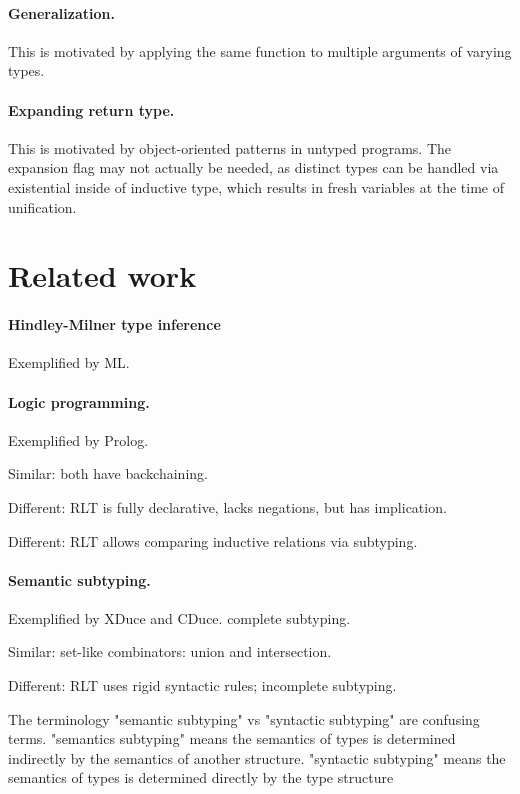 \documentclass[acmsmall]{acmart}
\begin{document}
\paragraph{Generalization.} This is motivated by applying the same function to multiple arguments of varying types.
\paragraph{Expanding return type.}  
This is motivated by object-oriented patterns in untyped programs.
The expansion flag may not actually be needed, as distinct types can be handled via existential inside of inductive type,
which results in fresh variables at the time of unification.

\section{Related work}

\paragraph{Hindley-Milner type inference}
Exemplified by ML.

\paragraph{Logic programming.}
Exemplified by Prolog. 

Similar: both have backchaining. 

Different: RLT is fully declarative, lacks negations, but has implication. 

Different: RLT allows comparing inductive relations via subtyping. 

\paragraph{Semantic subtyping.} 
Exemplified by XDuce and CDuce. complete subtyping.

Similar: set-like combinators: union and intersection.

Different: RLT uses rigid syntactic rules; incomplete subtyping.

The terminology "semantic subtyping" vs "syntactic subtyping" are confusing terms. 
"semantics subtyping" means the semantics of types is determined indirectly by the semantics of another structure.
"syntactic subtyping" means the semantics of types is determined directly by the type structure
\end{document}
